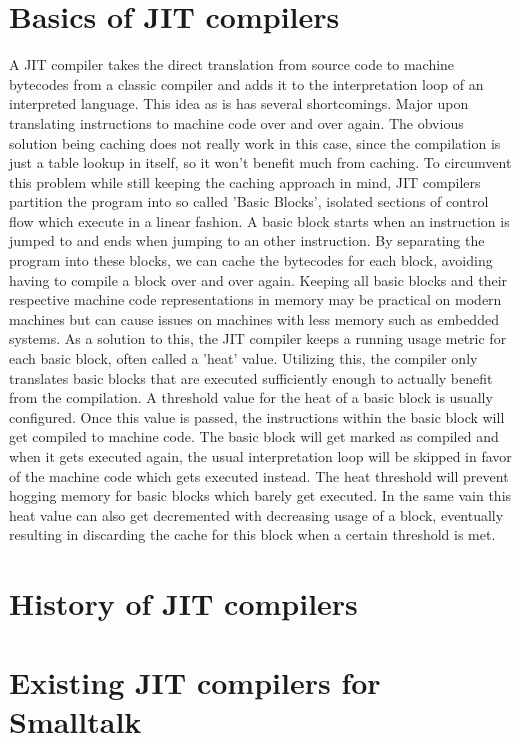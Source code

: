 \section{Basics of JIT compilers}
A JIT compiler takes the direct translation from source code to machine bytecodes from a classic compiler and adds it to the interpretation loop of an interpreted language.
This idea as is has several shortcomings. Major upon translating instructions to machine code over and over again. The obvious solution being caching does not really work in this case, since the compilation is just a table lookup in itself, so it won't benefit much from caching.
To circumvent this problem while still keeping the caching approach in mind, JIT compilers partition the program into so called 'Basic Blocks', isolated sections of control flow which execute in a linear fashion. 
A basic block starts when an instruction is jumped to and ends when jumping to an other instruction. 
By separating the program into these blocks, we can cache the bytecodes for each block, avoiding having to compile a block over and over again. 
Keeping all basic blocks and their respective machine code representations in memory may be practical on modern machines but can cause issues on machines with less memory such as embedded systems.
As a solution to this, the JIT compiler keeps a running usage metric for each basic block, often called a 'heat' value. 
Utilizing this, the compiler only translates basic blocks that are executed sufficiently enough to actually benefit from the compilation. 
A threshold value for the heat of a basic block is usually configured. 
Once this value is passed, the instructions within the basic block will get compiled to machine code.
The basic block will get marked as compiled and when it gets executed again, the usual interpretation loop will be skipped in favor of the machine code which gets executed instead. 
The heat threshold will prevent hogging memory for basic blocks which barely get executed. In the same vain this heat value can also get decremented with decreasing usage of a block, eventually resulting in discarding the cache for this block when a certain threshold is met. 

\section{History of JIT compilers}

\section{Existing JIT compilers for Smalltalk}
